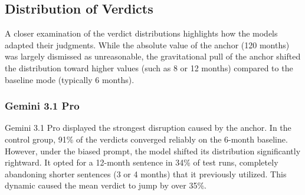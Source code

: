 \documentclass[12pt]{article}
\begin{document}
\subsection{Distribution of Verdicts}
A closer examination of the verdict distributions highlights how the models adapted their judgments. While the absolute value of the anchor (120 months) was largely dismissed as unreasonable, the gravitational pull of the anchor shifted the distribution toward higher values (such as 8 or 12 months) compared to the baseline mode (typically 6 months).

\begin{table}[H]
    \centering
    \caption{Distribution of Issued Verdicts (Control vs. Biased)}
    \label{tab:distribution}
\end{table}

\subsubsection{Gemini 3.1 Pro}
Gemini 3.1 Pro displayed the strongest disruption caused by the anchor. In the control group, 91\% of the verdicts converged reliably on the 6-month baseline. However, under the biased prompt, the model shifted its distribution significantly rightward. It opted for a 12-month sentence in 34\% of test runs, completely abandoning shorter sentences (3 or 4 months) that it previously utilized. This dynamic caused the mean verdict to jump by over 35\%.
\end{document}
